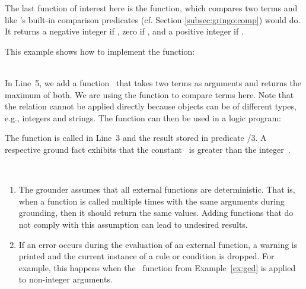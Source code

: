 The last function of interest here is the  function,
which compares two terms  and 
like \gringo's built-in comparison predicates (cf. Section \ref{subsec:gringo:comp}) would do.
It returns a negative integer if , zero if , and a positive integer if .
\begin{example}
This example shows how to implement the  function:
\\[-8pt] %
\begin{minipage}[t]{0.57\textwidth}

\end{minipage}
\begin{minipage}[t]{0.45\textwidth}

\end{minipage}\\
In Line~5, we add a function~
that  takes two terms as arguments
and returns the maximum of both.
We are using the  function to compare terms here.
Note that the \code{>} relation cannot be applied directly 
because objects can be of different types,
e.g., integers and strings.
The  function can then be used in a logic program:%
%

%
The function is called in Line~3 and the result stored in predicate /$3$.
A respective ground fact exhibits that the constant~ is greater than
the integer~.
\end{example}

\begin{note}~
\begin{enumerate}
\item The grounder assumes that all external functions are deterministic.
That is, when a function is called multiple times with the same arguments during grounding,
then it should return the same values.
Adding functions that do not comply with this assumption can lead to undesired results.
\item If an error occurs during the evaluation of an external function,
a warning is printed and the current instance of a rule or condition is dropped.
For example, this happens when the~ function from Example~\ref{ex:gcd} is applied to non-integer arguments.
\end{enumerate}
\end{note}

